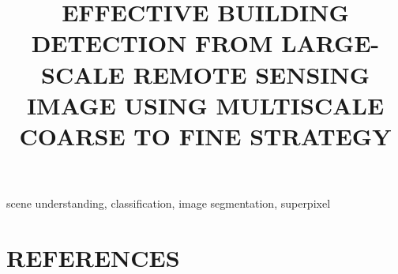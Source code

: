 \documentclass{article}
\title{EFFECTIVE BUILDING DETECTION FROM LARGE-SCALE REMOTE SENSING IMAGE USING MULTISCALE COARSE TO FINE STRATEGY}
\begin{document}
%
\maketitle
%
\begin{abstract}

\end{abstract}
%
\begin{keywords}
   scene understanding, classification, image segmentation, superpixel
\end{keywords}
%






\section{REFERENCES}
\label{sec:ref}



\end{document}
